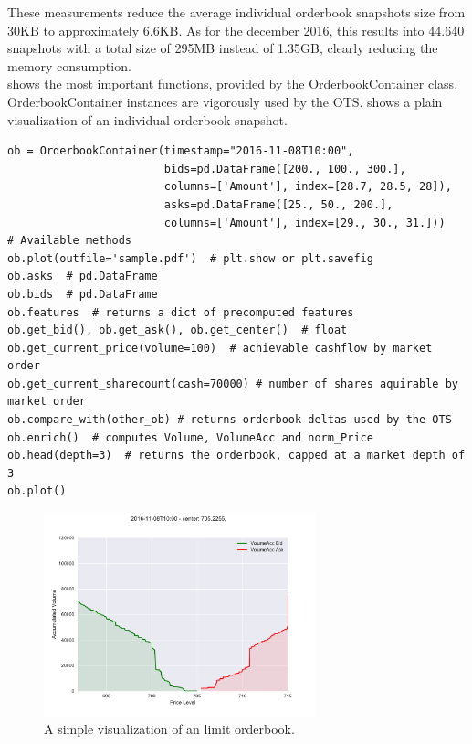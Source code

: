 These measurements reduce the average individual orderbook snapshots size from 30KB to approximately 6.6KB. As for the december 2016, this results into 44.640 snapshots with a total size of 295MB instead of 1.35GB, clearly reducing the memory consumption.\\

 shows the most important functions, provided by the OrderbookContainer class. OrderbookContainer instances are vigorously used by the \ac{OTS}.  shows a plain visualization of an individual orderbook snapshot.

\begin{lstlisting}[frame=single, breaklines=true, basicstyle=\scriptsize, caption=OrderbookContainer, label=lst:OrderbookContainer]
ob = OrderbookContainer(timestamp="2016-11-08T10:00",
                        bids=pd.DataFrame([200., 100., 300.],
                        columns=['Amount'], index=[28.7, 28.5, 28]),
                        asks=pd.DataFrame([25., 50., 200.],
                        columns=['Amount'], index=[29., 30., 31.]))
# Available methods
ob.plot(outfile='sample.pdf')  # plt.show or plt.savefig
ob.asks  # pd.DataFrame
ob.bids  # pd.DataFrame
ob.features  # returns a dict of precomputed features
ob.get_bid(), ob.get_ask(), ob.get_center()  # float
ob.get_current_price(volume=100)  # achievable cashflow by market order
ob.get_current_sharecount(cash=70000) # number of shares aquirable by market order
ob.compare_with(other_ob) # returns orderbook deltas used by the OTS
ob.enrich()  # computes Volume, VolumeAcc and norm_Price
ob.head(depth=3)  # returns the orderbook, capped at a market depth of 3
ob.plot()
\end{lstlisting}


\begin{figure}[ht]
	\centering
   \includegraphics[width=0.7\textwidth]{content/drawings/orderbook}
	\caption{A simple visualization of an limit orderbook.}
	\label{fig:orderbook}
\end{figure}


